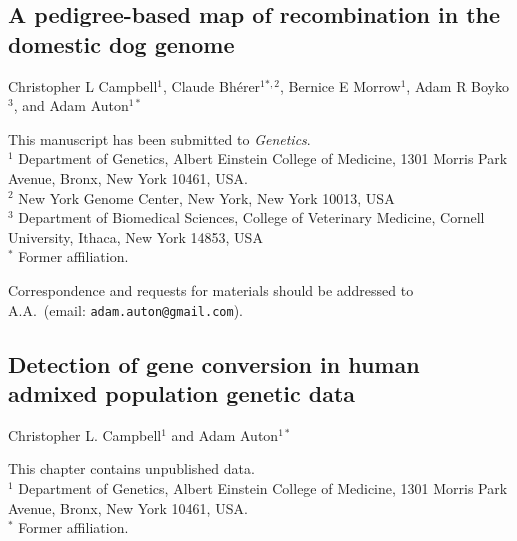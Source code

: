 \documentclass[11pt,twoside,openright,letterpaper]{memoir}
\begin{document}


\begin{SingleSpace}
\chapter[Recombination maps in the dog genome]{A pedigree-based map of recombination in the domestic dog genome} \label{ch:dogPed}

\noindent Christopher L Campbell$^1$, Claude Bh\'{e}rer$^{1*,2}$, Bernice E Morrow$^1$, Adam R Boyko$^3$, and Adam Auton$^{1*}$

\vspace{0.5cm}
\noindent This manuscript has been submitted to \textit{Genetics}. \\

\vspace{0.5cm}
\noindent $^1$ Department of Genetics, Albert Einstein College of Medicine, 1301 Morris Park Avenue, Bronx, New York 10461, USA. \\
\noindent $^2$ New York Genome Center, New York, New York 10013, USA \\
\noindent $^3$ Department of Biomedical Sciences, College of Veterinary Medicine, Cornell University, Ithaca, New York 14853, USA \\
\noindent $^*$ Former affiliation.

\vspace{0.5cm}
\begin{centering}
    Correspondence and requests for materials should be addressed to \\
    A.A.\ (email: \texttt{adam.auton@gmail.com}). \\
\end{centering}
\end{SingleSpace}



\begin{SingleSpace}
\chapter[A model for the detection of gene conversion]{Detection of gene conversion in human admixed population genetic data} \label{ch:geneConv}

\noindent Christopher L. Campbell$^1$ and Adam Auton$^{1*}$

\vspace{0.5cm}
\noindent This chapter contains unpublished data.\\

\vspace{0.5cm}
\noindent $^1$ Department of Genetics, Albert Einstein College of Medicine, 1301 Morris Park Avenue, Bronx, New York 10461, USA. \\
\noindent $^*$ Former affiliation.
\end{SingleSpace}
\end{document}
